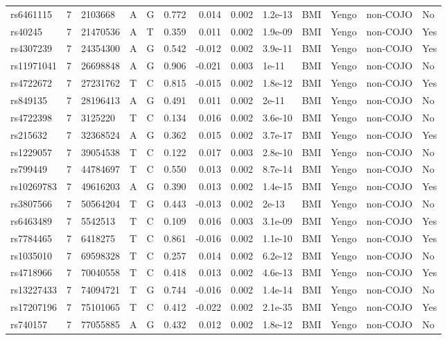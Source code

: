 \documentclass[11pt,twoside]{bristolthesis}
\begin{document}
\begin{longtable}[t]{lrlllrrrlllll}
rs6461115 & 7 & 2103668 & A & G & 0.772 & 0.014 & 0.002 & 1.2e-13 & BMI & Yengo & non-COJO & No\\
rs40245 & 7 & 21470536 & A & T & 0.359 & 0.011 & 0.002 & 1.9e-09 & BMI & Yengo & non-COJO & Yes\\
rs4307239 & 7 & 24354300 & A & G & 0.542 & -0.012 & 0.002 & 3.9e-11 & BMI & Yengo & non-COJO & Yes\\
\addlinespace
rs11971041 & 7 & 26698848 & A & G & 0.906 & -0.021 & 0.003 & 1e-11 & BMI & Yengo & non-COJO & No\\
rs4722672 & 7 & 27231762 & T & C & 0.815 & -0.015 & 0.002 & 1.8e-12 & BMI & Yengo & non-COJO & Yes\\
rs849135 & 7 & 28196413 & A & G & 0.491 & 0.011 & 0.002 & 2e-11 & BMI & Yengo & non-COJO & No\\
rs4722398 & 7 & 3125220 & T & C & 0.134 & 0.016 & 0.002 & 3.6e-10 & BMI & Yengo & non-COJO & No\\
rs215632 & 7 & 32368524 & A & G & 0.362 & 0.015 & 0.002 & 3.7e-17 & BMI & Yengo & non-COJO & Yes\\
\addlinespace
rs1229057 & 7 & 39054538 & T & C & 0.122 & 0.017 & 0.003 & 2.8e-10 & BMI & Yengo & non-COJO & No\\
rs799449 & 7 & 44784697 & T & C & 0.550 & 0.013 & 0.002 & 8.7e-14 & BMI & Yengo & non-COJO & No\\
rs10269783 & 7 & 49616203 & A & G & 0.390 & 0.013 & 0.002 & 1.4e-15 & BMI & Yengo & non-COJO & Yes\\
rs3807566 & 7 & 50564204 & T & G & 0.443 & -0.013 & 0.002 & 2e-13 & BMI & Yengo & non-COJO & No\\
rs6463489 & 7 & 5542513 & T & C & 0.109 & 0.016 & 0.003 & 3.1e-09 & BMI & Yengo & non-COJO & Yes\\
\addlinespace
rs7784465 & 7 & 6418275 & T & C & 0.861 & -0.016 & 0.002 & 1.1e-10 & BMI & Yengo & non-COJO & Yes\\
rs1035010 & 7 & 69598328 & T & C & 0.257 & 0.014 & 0.002 & 6.2e-12 & BMI & Yengo & non-COJO & No\\
rs4718966 & 7 & 70040558 & T & C & 0.418 & 0.013 & 0.002 & 4.6e-13 & BMI & Yengo & non-COJO & Yes\\
rs13227433 & 7 & 74094721 & T & G & 0.744 & -0.016 & 0.002 & 1.4e-14 & BMI & Yengo & non-COJO & No\\
rs17207196 & 7 & 75101065 & T & C & 0.412 & -0.022 & 0.002 & 2.1e-35 & BMI & Yengo & non-COJO & Yes\\
\addlinespace
rs740157 & 7 & 77055885 & A & G & 0.432 & 0.012 & 0.002 & 1.8e-12 & BMI & Yengo & non-COJO & No\\

\end{longtable}
\end{document}

